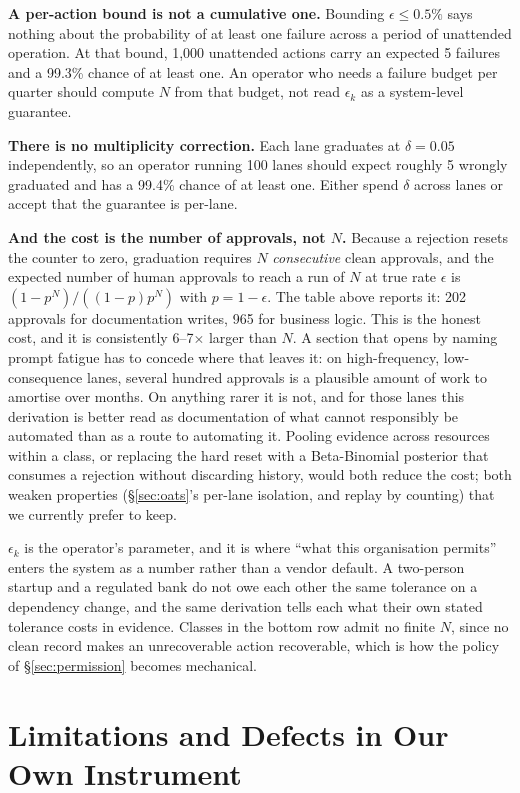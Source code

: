 \documentclass[10pt]{article}
\begin{document}
\textbf{A per-action bound is not a cumulative one.} Bounding $\epsilon \leq 0.5\%$
says nothing about the probability of at least one failure across a period of
unattended operation. At that bound, 1{,}000 unattended actions carry an expected 5
failures and a 99.3\% chance of at least one. An operator who needs a failure budget
per quarter should compute $N$ from that budget, not read $\epsilon_k$ as a
system-level guarantee.

\textbf{There is no multiplicity correction.} Each lane graduates at $\delta = 0.05$
independently, so an operator running 100 lanes should expect roughly 5 wrongly
graduated and has a 99.4\% chance of at least one. Either spend $\delta$ across lanes
or accept that the guarantee is per-lane.

\textbf{And the cost is the number of approvals, not $N$.} Because a rejection resets
the counter to zero, graduation requires $N$ \emph{consecutive} clean approvals, and
the expected number of human approvals to reach a run of $N$ at true rate $\epsilon$
is $(1-p^N)/((1-p)p^N)$ with $p = 1-\epsilon$. The table above reports it: 202
approvals for documentation writes, 965 for business logic. This is the honest cost,
and it is consistently 6--7$\times$ larger than $N$. A section that opens by naming prompt fatigue has to
concede where that leaves it: on high-frequency, low-consequence lanes, several
hundred approvals is a plausible amount of work to amortise over months. On anything
rarer it is not, and for those lanes this derivation is better read as documentation
of what cannot responsibly be automated than as a route to automating it. Pooling
evidence across resources within a class, or replacing the hard reset with a
Beta-Binomial posterior that consumes a rejection without discarding history, would
both reduce the cost; both weaken properties (\S\ref{sec:oats}'s per-lane isolation,
and replay by counting) that we currently prefer to keep.

$\epsilon_k$ is the operator's parameter, and it is where ``what this organisation
permits'' enters the system as a number rather than a vendor default. A two-person
startup and a regulated bank do not owe each other the same tolerance on a dependency
change, and the same derivation tells each what their own stated tolerance costs in
evidence. Classes in the bottom row admit no finite $N$, since no clean record makes
an unrecoverable action recoverable, which is how the policy of
\S\ref{sec:permission} becomes mechanical.

\section{Limitations and Defects in Our Own Instrument}
\label{sec:defects}
\end{document}
